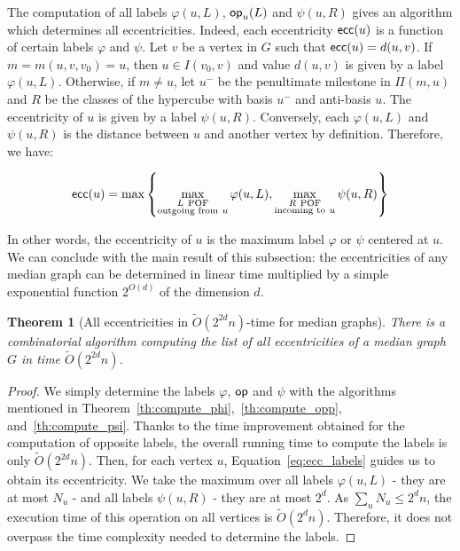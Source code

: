 \documentclass{article}
\newtheorem{theorem}{Theorem}
\newcommand{\set}[1]{\left\{ #1 \right\}}
\newcommand{\ecc}{\mbox{\textsf{ecc}}}
\newcommand{\opp}{\mbox{\textsf{op}}}
\begin{document}
 The computation of all labels $\varphi(u,L)$, $\opp_u(L)$ and $\psi(u,R)$ gives an algorithm which determines all eccentricities. Indeed, each eccentricity $\ecc(u)$ is a function of certain labels $\varphi$ and $\psi$. Let $v$ be a vertex in $G$ such that $\ecc(u) = d(u,v)$. If $m = m(u,v,v_0) = u$, then $u \in I(v_0,v)$ and value $d(u,v)$ is given by a label $\varphi(u,L)$. Otherwise, if $m \neq u$, let $u^-$ be the penultimate milestone in $\Pi(m,u)$ and $R$ be the classes of the hypercube with basis $u^-$ and anti-basis $u$. The eccentricity of $u$ is given by a label $\psi(u,R)$. Conversely, each $\varphi(u,L)$ and $\psi(u,R)$ is the distance between $u$ and another vertex by definition. Therefore, we have:

\begin{equation}
\ecc(u) = \mbox{max}\set{\max\limits_{\substack{L ~\mbox{\scriptsize{POF}} \\ \mbox{\scriptsize{outgoing from}}~ u}} \varphi(u,L), \max\limits_{\substack{R ~\mbox{\scriptsize{POF}} \\ \mbox{\scriptsize{incoming to}}~ u}} \psi(u,R)}
\label{eq:ecc_labels}
\end{equation}

In other words, the eccentricity of $u$ is the maximum label $\varphi$ or $\psi$ centered at $u$. We can conclude with the main result of this subsection: the eccentricities of any median graph can be determined in linear time multiplied by a simple exponential function $2^{O(d)}$ of the dimension $d$.

\begin{theorem}[All eccentricities in $\tilde{O}(2^{2d}n)$-time for median graphs]
There is a combinatorial algorithm computing the list of all eccentricities of a median graph $G$ in time $\tilde{O}(2^{2d}n)$.
\label{th:simple_ecc}
\end{theorem}
\begin{proof}
We simply determine the labels $\varphi$, $\opp$ and $\psi$ with the algorithms mentioned in Theorem~\ref{th:compute_phi},~\ref{th:compute_opp}, and~\ref{th:compute_psi}. Thanks to the time improvement obtained for the computation of opposite labels, the overall running time to compute the labels is only $\tilde{O}(2^{2d}n)$. Then, for each vertex $u$, Equation~\eqref{eq:ecc_labels} guides us to obtain its eccentricity. We take the maximum over all labels $\varphi(u,L)$ - they are at most $N_u$ - and all labels $\psi(u,R)$ - they are at most $2^d$. As $\sum_u N_u \le 2^dn$, the execution time of this operation on all vertices is $\tilde{O}(2^dn)$. Therefore, it does not overpass the time complexity needed to determine the labels.
\end{proof}
\end{document}
